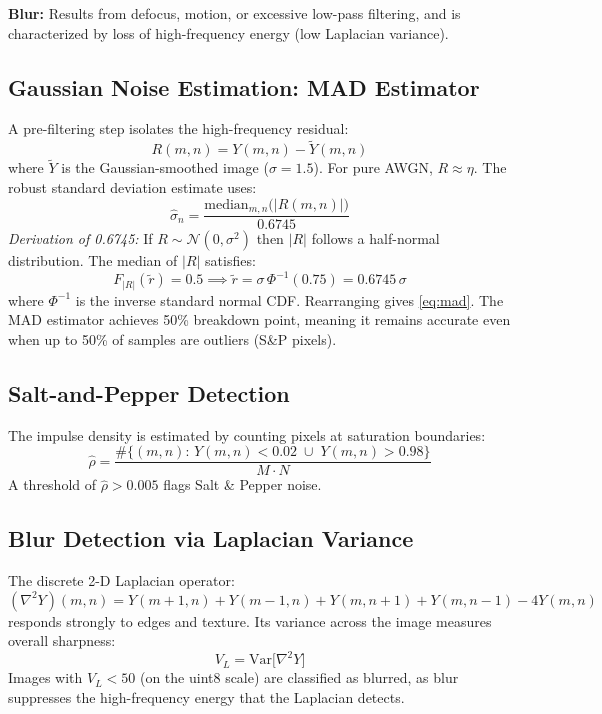 \documentclass[10pt,conference]{IEEEtran}
\begin{document}
\textbf{Blur:} Results from defocus, motion, or excessive low-pass filtering, and is characterized by loss of high-frequency energy (low Laplacian variance).

\subsection{Gaussian Noise Estimation: MAD Estimator}

A pre-filtering step isolates the high-frequency residual:
\begin{equation}
R(m,n) = Y(m,n) - \tilde{Y}(m,n)
\end{equation}
where $\tilde{Y}$ is the Gaussian-smoothed image ($\sigma = 1.5$). For pure AWGN, $R \approx \eta$. The robust standard deviation estimate uses:
\begin{equation}
\hat{\sigma}_n = \frac{\mathrm{median}_{m,n}\bigl(|R(m,n)|\bigr)}{0.6745}
\label{eq:mad}
\end{equation}
\textit{Derivation of 0.6745:} If $R \sim \mathcal{N}(0,\sigma^2)$ then $|R|$ follows a half-normal distribution. The median of $|R|$ satisfies:
\begin{equation}
F_{|R|}\!\left(\tilde{r}\right) = 0.5 \implies \tilde{r} = \sigma\,\Phi^{-1}(0.75) = 0.6745\,\sigma
\end{equation}
where $\Phi^{-1}$ is the inverse standard normal CDF. Rearranging gives \eqref{eq:mad}. The MAD estimator achieves 50\% breakdown point, meaning it remains accurate even when up to 50\% of samples are outliers (S\&P pixels).

\subsection{Salt-and-Pepper Detection}
The impulse density is estimated by counting pixels at saturation boundaries:
\begin{equation}
\hat{\rho} = \frac{\#\{(m,n):\, Y(m,n) < 0.02\;\cup\; Y(m,n) > 0.98\}}{M \cdot N}
\end{equation}
A threshold of $\hat{\rho} > 0.005$ flags Salt \& Pepper noise.

\subsection{Blur Detection via Laplacian Variance}
The discrete 2-D Laplacian operator:
\begin{equation}
(\nabla^2 Y)(m,n) = Y(m{+}1,n) + Y(m{-}1,n) + Y(m,n{+}1) + Y(m,n{-}1) - 4Y(m,n)
\end{equation}
responds strongly to edges and texture. Its variance across the image measures overall sharpness:
\begin{equation}
V_L = \mathrm{Var}\bigl[\nabla^2 Y\bigr]
\end{equation}
Images with $V_L < 50$ (on the uint8 scale) are classified as blurred, as blur suppresses the high-frequency energy that the Laplacian detects.
\end{document}
